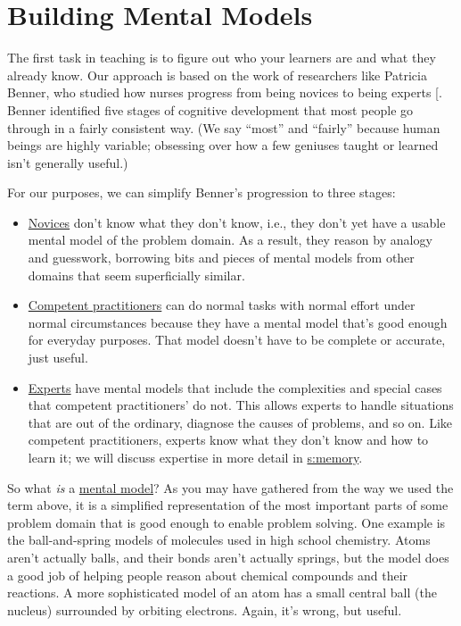 \chapter{Building Mental Models}\label{s:models}

The first task in teaching is to figure out who your learners are and
what they already know. Our approach is based on the work of researchers
like Patricia Benner, who studied how nurses progress from being novices
to being experts {[}\protect[\hyperlink{b:Benn2000}{Benn2000}]{]}. Benner identified five stages of
cognitive development that most people go through in a fairly consistent
way. (We say ``most'' and ``fairly'' because human beings are highly
variable; obsessing over how a few geniuses taught or learned isn't
generally useful.)

For our purposes, we can simplify Benner's progression to three stages:

\begin{itemize}
\item
  \protect\hyperlink{g:novice}{Novices}
  don't know what they don't know, i.e., they don't yet have a usable
  mental model of the problem domain. As a result, they reason by
  analogy and guesswork, borrowing bits and pieces of mental models
  from other domains that seem superficially similar.
\item
  \protect\hyperlink{g:competent-practitioner}{Competent practitioners}
  can do normal tasks with normal effort under normal circumstances
  because they have a mental model that's good enough for everyday
  purposes. That model doesn't have to be complete or accurate, just
  useful.
\item
  \protect\hyperlink{g:expert}{Experts}
  have mental models that include the complexities and special cases
  that competent practitioners' do not. This allows experts to handle
  situations that are out of the ordinary, diagnose the causes of
  problems, and so on. Like competent practitioners, experts know what
  they don't know and how to learn it; we will discuss expertise in
  more detail in \protect\hyperlink{CHAPTER}{s:memory}.
\end{itemize}

So what \emph{is} a \protect\hyperlink{g:mental-model}{mental model}? As you may
have gathered from the way we used the term above, it is a simplified
representation of the most important parts of some problem domain that
is good enough to enable problem solving. One example is the
ball-and-spring models of molecules used in high school chemistry. Atoms
aren't actually balls, and their bonds aren't actually springs, but the
model does a good job of helping people reason about chemical compounds
and their reactions. A more sophisticated model of an atom has a small
central ball (the nucleus) surrounded by orbiting electrons. Again, it's
wrong, but useful.

